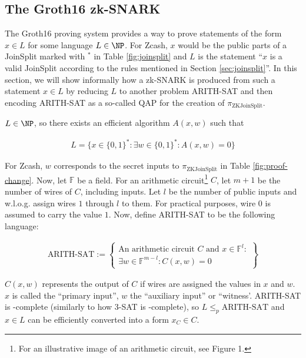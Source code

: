 \documentclass{article}
\begin{document}
\subsection{The Groth16 zk-SNARK}

The Groth16 proving system provides a way to prove statements of the form $x \in L$ for some language $L \in \NP$.
For Zcash, $x$ would be the public parts of a JoinSplit marked with $^\ast$ in Table \ref{fig:joinsplit} and $L$ is the statement ``$x$ is a valid JoinSplit according to the rules mentioned in Section \ref{sec:joinsplit}''.
In this section, we will show informally how a zk-SNARK is produced from such a statement $x \in L$ by reducing $L$ to another problem ARITH-SAT and then encoding ARITH-SAT as a so-called QAP for the creation of $\pi_\text{ZKJoinSplit}$.

$L \in \NP$, so there exists an efficient algorithm $A(x, w)$ such that

\begin{align*} L = \{ x \in \{0,1\}^\ast \colon \exists w \in \{0,1\}^\ast\colon A(x, w) = 0\} \end{align*}

For Zcash, $w$ corresponds to the secret inputs to $\pi_\text{ZKJoinSplit}$ in Table \ref{fig:proof-change}.
Now, let $\mathbb{F}$ be a field.
For an arithmetic circuit\footnote{For an illustrative image of an arithmetic circuit, see \cite{gennaro:qap} Figure 1.} $C$, let $m + 1$ be the number of wires of $C$, including inputs.
Let $l$ be the number of public inputs and w.l.o.g. assign wires $1$ through $l$ to them.
For practical purposes, wire $0$ is assumed to carry the value $1$.
Now, define ARITH-SAT to be the following language:

\begin{align*}
        \text{ARITH-SAT} := \left\{\begin{aligned}\text{An arithmetic circuit } C \text{ and } x \in \mathbb{F}^l \colon \\
        \exists w \in \mathbb{F}^{m-l}\colon C(x,w) = 0\end{aligned}\right\}
\end{align*}

$C(x,w)$ represents the output of $C$ if wires are assigned the values in $x$ and $w$.
$x$ is called the ``primary input'', $w$ the ``auxiliary input'' or ``witness'.
ARITH-SAT is \NP-complete (similarly to how 3-SAT is \NP-complete), so $L \leq_p \text{ARITH-SAT}$ and $x \in L$ can be efficiently converted into a form $x_C \in C$.
\end{document}
